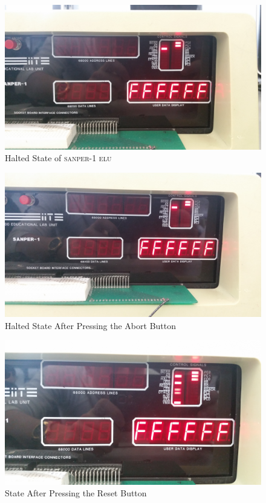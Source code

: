 \documentclass[12pt, twocolumn]{article}
\begin{document}
\begin{figure}[h!]
\centering
\includegraphics[width=1\linewidth]{20150203_094107}
\caption{Halted State of \textsc{sanper-1 elu}}
\label{fig:halt}
\end{figure}

\begin{figure}[h!]
\centering
\includegraphics[width=1\linewidth]{20150203_094116}
\caption{Halted State After Pressing the Abort Button}
\label{fig:abort}
\end{figure}

\begin{figure}[H]
\centering
\includegraphics[width=1\linewidth]{20150203_094134}
\caption{State After Pressing the Reset Button}
\label{fig:reset}
\end{figure}
\end{document}

